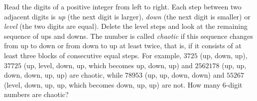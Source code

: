 Read the digits of a positive integer from left to right. Each step between two adjacent digits is \emph{up} (the next digit is larger), \emph{down} (the next digit is smaller) or \emph{level} (the two digits are equal). Delete the level steps and look at the remaining sequence of ups and downs. The number is called \emph{chaotic} if this sequence changes from up to down or from down to up at least twice, that is, if it consists of at least three blocks of consecutive equal steps. For example, $3725$ (up, down, up), $37725$ (up, level, down, up, which becomes up, down, up) and $2562178$ (up, up, down, down, up, up) are chaotic, while $78953$ (up, up, down, down) and $55267$ (level, down, up, up, which becomes down, up, up) are not. How many $6$-digit numbers are chaotic?
